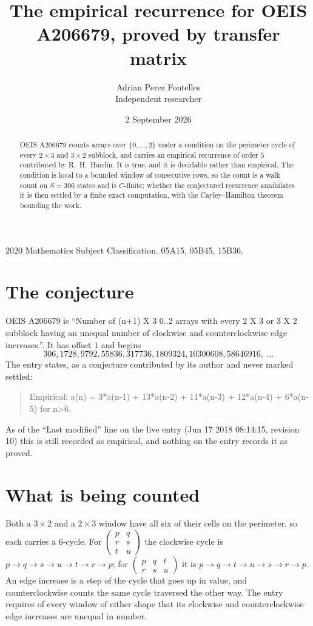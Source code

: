 \documentclass[11pt,a4paper]{article}
\title{The empirical recurrence for OEIS A206679, proved by transfer matrix}
\author{Adrian Perez Fontelles\\ \small Independent researcher}
\date{2 September 2026}
\theoremstyle{plain}
\theoremstyle{definition}
\begin{document}
\maketitle

\begin{abstract}
OEIS A206679 counts arrays over $\{0,\dots,2\}$ under a condition on the perimeter cycle of
every $2\times3$ and $3\times2$ subblock, and carries an empirical recurrence of order $5$ contributed by
R.~H.~Hardin. It is true, and it is decidable rather than empirical. The condition is local to
a bounded window of consecutive rows, so the count is a walk count on $S=306$ states and is
$C$-finite; whether the conjectured recurrence annihilates it is then settled by a finite exact
computation, with the Cayley--Hamilton theorem bounding the work.
\end{abstract}

\noindent\small 2020 Mathematics Subject Classification. 05A15, 05B45, 15B36.\normalsize

\section{The conjecture}

OEIS A206679 is ``Number of (n+1) X 3 0..2 arrays with every 2 X 3 or 3 X 2 subblock having an unequal number of clockwise and counterclockwise edge increases.''. It has offset $1$ and begins
\[
306, 1728, 9792, 55836, 317736, 1809324, 10300608, 58646916,\ \dots
\]
The entry states, as a conjecture contributed by its author and never marked settled:
\begin{quote}
Empirical: a(n) = 3*a(n-1) + 13*a(n-2) + 11*a(n-3) + 12*a(n-4) + 6*a(n-5) for n>6.
\end{quote}
As of the ``Last modified'' line on the live entry (Jun 17 2018 08:14:15, revision 10) this is still
recorded as empirical, and nothing on the entry records it as proved.

\section{What is being counted}

Both a $3\times2$ and a $2\times3$ window have all six of their cells on the
perimeter, so each carries a $6$-cycle. For
$\begin{pmatrix}p&q\\r&s\\t&u\end{pmatrix}$ the clockwise cycle is
$p\to q\to s\to u\to t\to r\to p$; for
$\begin{pmatrix}p&q&t\\r&s&u\end{pmatrix}$ it is
$p\to q\to t\to u\to s\to r\to p$. An edge increase is a step of the cycle that goes up in
value, and counterclockwise counts the same cycle traversed the other way. The entry requires
of every window of either shape that its clockwise and counterclockwise edge increases are unequal in number.
\end{document}

